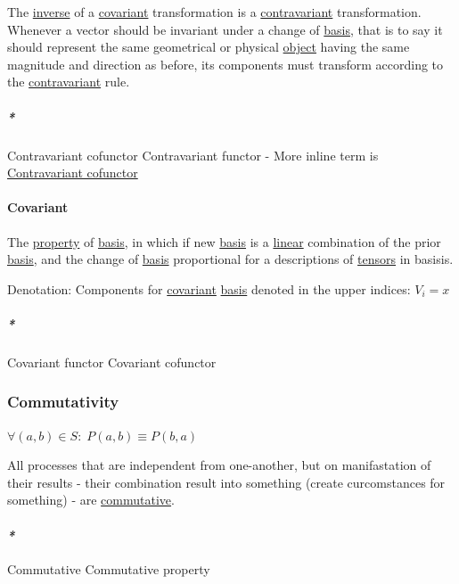 \documentclass[a4paper,14pt,oneside]{book}
\begin{document}
The \hyperref[org94418f8]{inverse} of a \hyperref[org4f14db3]{covariant} transformation is a \hyperref[org205b436]{contravariant} transformation. Whenever a vector should be invariant under a change of \hyperref[org69d8f32]{basis}, that is to say it should represent the same geometrical or physical \hyperref[org95363b3]{object} having the same magnitude and direction as before, its components must transform according to the \hyperref[org205b436]{contravariant} rule.

\subparagraph{\emph{*}}
\label{sec:org012794f}

\label{orgf2aa50a}Contravariant cofunctor
\label{org69e4875}Contravariant functor - More inline term is \hyperref[orgf2aa50a]{Contravariant cofunctor}

\paragraph{\label{org4f14db3}Covariant}
\label{sec:org309d63e}
The \hyperref[orgc187516]{property} of \hyperref[org69d8f32]{basis}, in which if new \hyperref[org69d8f32]{basis} is a \hyperref[org72bffc1]{linear} combination of the prior \hyperref[org69d8f32]{basis}, and the change of \hyperref[org69d8f32]{basis} proportional for a descriptions of \hyperref[orgcdee9d6]{tensors} in basisis.

Denotation:
Components for \hyperref[org4f14db3]{covariant} \hyperref[org69d8f32]{basis} denoted in the upper indices:
\(V_{i} = x\)

\subparagraph{\emph{*}}
\label{sec:org0ed1f18}

\label{orgbd788bd}Covariant functor
\label{orgc0e57cd}Covariant cofunctor

\subsubsection{\label{org4078b7d}Commutativity}
\label{sec:org48453f0}
\(\forall (a,b) \in S : \; P(a,b) \equiv P(b,a)\)

All processes that are independent from one-another, but on manifastation of their results - their combination result into something (create curcomstances for something) - are \hyperref[org37e249c]{commutative}.

\paragraph{\emph{*}}
\label{sec:orgf624937}

\label{org37e249c}Commutative
\label{org5dde5fc}Commutative property
\end{document}

